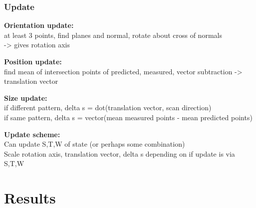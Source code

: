 	\subsubsection{Update}
		\textbf{Orientation update:}\\
			at least 3 points, find planes and normal, rotate about cross of normals\\
			-> gives rotation axis
			
		\textbf{Position update:}\\
			find mean of intersection points of predicted, measured, vector subtraction
			-> translation vector
			
		\textbf{Size update:}\\
			if different pattern, delta s = dot(translation vector, scan direction)\\
			if same pattern, delta s = vector(mean measured points - mean predicted points)
			
		\textbf{Update scheme:}\\
			Can update S,T,W of state (or perhaps some combination)\\
			Scale rotation axis, translation vector, delta s depending on if update is via S,T,W
			
\section{Results}